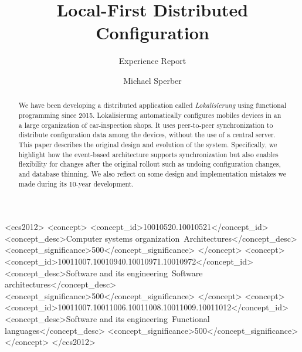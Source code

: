 \documentclass[sigplan,review]{acmart}
\begin{document}
\title{Local-First Distributed Configuration}
\subtitle{Experience Report}

\author{Michael Sperber}

\begin{abstract}
  We have been developing a distributed application called
  \textit{Lokalisierung} using functional programming since 2015.
  Lokalisierung automatically configures mobiles devices in an a large
  organization of car-inspection shops. It uses peer-to-peer
  synchronization to distribute configuration data among the devices,
  without the use of a central server.  This paper describes the
  original design and evolution of the system.  Specifically, we
  highlight how the event-based architecture supports synchronization
  but also enables flexibility for changes after the original rollout
  such as undoing configuration changes, and database thinning.  We
  also reflect on some design and implementation mistakes we made during its
  10-year development.
\end{abstract}

\begin{CCSXML}
<ccs2012>
   <concept>
       <concept_id>10010520.10010521</concept_id>
       <concept_desc>Computer systems organization~Architectures</concept_desc>
       <concept_significance>500</concept_significance>
       </concept>
   <concept>
       <concept_id>10011007.10010940.10010971.10010972</concept_id>
       <concept_desc>Software and its engineering~Software architectures</concept_desc>
       <concept_significance>500</concept_significance>
       </concept>
   <concept>
       <concept_id>10011007.10011006.10011008.10011009.10011012</concept_id>
       <concept_desc>Software and its engineering~Functional languages</concept_desc>
       <concept_significance>500</concept_significance>
       </concept>
 </ccs2012>
\end{CCSXML}


\end{document}
